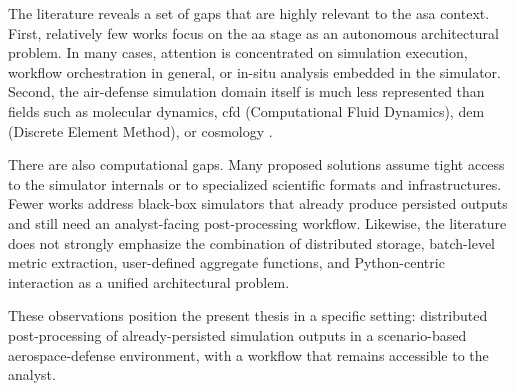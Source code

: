 The literature reveals a set of gaps that are highly relevant to the \gls{asa} context. First, relatively few works focus on the \gls{aa} stage as an autonomous architectural problem. In many cases, attention is concentrated on simulation execution, workflow orchestration in general, or in-situ analysis embedded in the simulator. Second, the air-defense simulation domain itself is much less represented than fields such as molecular dynamics, \gls{cfd} (Computational Fluid Dynamics), \gls{dem} (Discrete Element Method), or cosmology \parencite{li2018postprocessing,lagares2022aquila,morrissey2020velassco,friesen2016insitu}.

There are also computational gaps. Many proposed solutions assume tight access to the simulator internals or to specialized scientific formats and infrastructures. Fewer works address black-box simulators that already produce persisted outputs and still need an analyst-facing post-processing workflow. Likewise, the literature does not strongly emphasize the combination of distributed storage, batch-level metric extraction, user-defined aggregate functions, and Python-centric interaction as a unified architectural problem.

These observations position the present thesis in a specific setting: distributed post-processing of already-persisted simulation outputs in a scenario-based aerospace-defense environment, with a workflow that remains accessible to the analyst.
